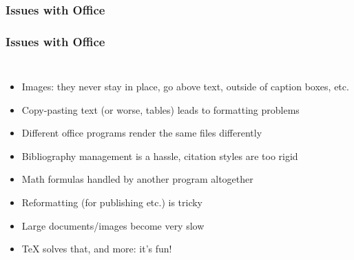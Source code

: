 \documentclass[colorlinks]{beamer} %
\begin{document}
  \subsubsection{Issues with Office}
  \begin{frame}
    \frametitle{Issues with Office}
    \begin{columns}
      \begin{itemize}
      \item Images: they never stay in place, go above text, outside of caption boxes, etc.
      \item Copy-pasting text (or worse, tables) leads to formatting problems
      \item Different office programs render the same files differently
      \item Bibliography management is a hassle, citation styles are too rigid
      \item Math formulas handled by another program altogether
      \item Reformatting (for publishing etc.) is tricky
      \item Large documents/images become very slow
      \item \TeX{} solves that, and more: it's fun!
      \end{itemize}
      
    \end{columns}
  \end{frame}
  
\end{document}
